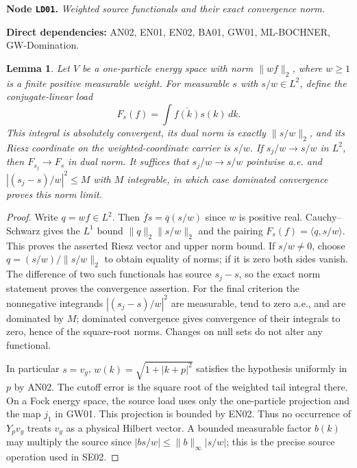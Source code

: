 \documentclass[11pt,a4paper]{article}
\newtheorem{lemma}[theorem]{Lemma}
\theoremstyle{remark}\newtheorem{remark}[theorem]{Remark}
\newcommand{\node}[3]{\par\Needspace{6\baselineskip}\smallskip\hypertarget{node:#1}{}\label{nodepage:#1}\noindent\textbf{Node \texttt{#1}.} \textit{#2.}\par\noindent\textbf{Direct dependencies:} #3.\par}
\begin{document}
\node{LD01}{Weighted source functionals and their exact convergence norm}{AN02, EN01, EN02, BA01, GW01, ML-BOCHNER, GW-Domination}
\begin{lemma}\label{lem:weightedloads}
Let $V$ be a one-particle energy space with norm $\|wf\|_2$, where $w\geq1$ is a finite positive measurable weight. For measurable $s$ with $s/w\in L^2$, define the conjugate-linear load
\[
 F_s(f)=\int\overline{f(k)}s(k)\,dk.
\]
This integral is absolutely convergent, its dual norm is exactly $\|s/w\|_2$, and its Riesz coordinate on the weighted-coordinate carrier is $s/w$. If $s_j/w\to s/w$ in $L^2$, then $F_{s_j}\to F_s$ in dual norm. It suffices that $s_j/w\to s/w$ pointwise a.e. and
$|(s_j-s)/w|^2\leq M$ with $M$ integrable, in which case dominated convergence proves this norm limit.
\end{lemma}
\begin{proof}
Write $q=wf\in L^2$. Then $\overline f s=\overline q(s/w)$ since $w$ is positive real. Cauchy--Schwarz gives the $L^1$ bound $\|q\|_2\|s/w\|_2$ and the pairing $F_s(f)=\langle q,s/w\rangle$. This proves the asserted Riesz vector and upper norm bound. If $s/w\ne0$, choose $q=(s/w)/\|s/w\|_2$ to obtain equality of norms; if it is zero both sides vanish. The difference of two such functionals has source $s_j-s$, so the exact norm statement proves the convergence assertion. For the final criterion the nonnegative integrands $|(s_j-s)/w|^2$ are measurable, tend to zero a.e., and are dominated by $M$; dominated convergence gives convergence of their integrals to zero, hence of the square-root norms. Changes on null sets do not alter any functional.

In particular $s=v_g$, $w(k)=\sqrt{1+|k+p|^2}$ satisfies the hypothesis uniformly in $p$ by AN02. The cutoff error is the square root of the weighted tail integral there. On a Fock energy space, the source load uses only the one-particle projection and the map $j_1$ in GW01. This projection is bounded by EN02. Thus no occurrence of $Y_pv_g$ treats $v_g$ as a physical Hilbert vector. A bounded measurable factor $b(k)$ may multiply the source since $|b s/w|\leq\|b\|_\infty|s/w|$; this is the precise source operation used in SE02.
\end{proof}
\end{document}
